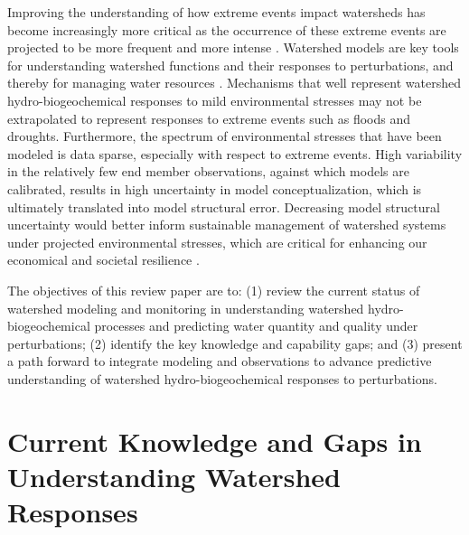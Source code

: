 \documentclass[preprint,review, 12pt]{elsarticle}
\begin{document}
Improving the understanding of how extreme events impact watersheds has become increasingly more critical as the occurrence of these extreme events are projected to be more frequent and more intense \citep{IPCC2012}. Watershed models are key tools for understanding watershed functions and their responses to perturbations, and thereby for managing water resources \citep{Weiler2004, Burt2005, Beven1997, Jones1993}. Mechanisms that well represent watershed hydro-biogeochemical responses to mild environmental stresses may not be extrapolated to represent responses to extreme events such as floods and droughts. Furthermore, the spectrum of environmental stresses that have been modeled is data sparse, especially with respect to extreme events. High variability in the relatively few end member observations, against which models are calibrated, results in high uncertainty in model conceptualization, which is ultimately translated into model structural error. Decreasing model structural uncertainty would better inform sustainable management of watershed systems under projected environmental stresses, which are critical for enhancing our economical and societal resilience \citep{Srinivasan2017, McDonnell2018b}.


The objectives of this review paper are to: (1) review the current status of watershed modeling and monitoring in understanding watershed hydro-biogeochemical processes and predicting water quantity and quality under perturbations; (2) identify the key knowledge and capability gaps; and (3) present a path forward to integrate modeling and observations to advance predictive understanding of watershed hydro-biogeochemical responses to perturbations.


\section{Current Knowledge and Gaps in Understanding Watershed Responses}
\end{document}
